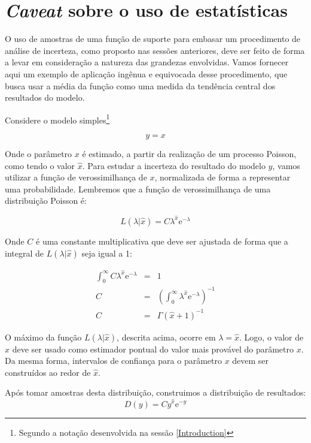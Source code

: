 \section{{\em Caveat} sobre o uso de estatísticas}

O uso de amostras de uma função de suporte para embasar um procedimento de análise de incerteza, como proposto
nas sessões anteriores, deve ser feito de forma a levar em consideração a natureza das grandezas envolvidas.
Vamos fornecer aqui um exemplo de aplicação ingênua e equivocada desse procedimento, que busca usar a média
da função como uma medida da tendência central dos resultados do modelo.

Considere o modelo simples\footnote{Segundo a notação desenvolvida na sessão \ref{Introduction}}

\begin{equation}
	y = x
\end{equation}

Onde o par\^ametro $x$ \'e estimado, a partir da realiza\c c\~ao de um
processo Poisson, como tendo o valor $\hat x$. Para estudar a incerteza
do resultado do modelo $y$, vamos utilizar a fun\c c\~ao de verossimilhan\c ca
de $x$, normalizada de forma a representar uma probabilidade. Lembremos que
a fun\c c\~ao de verossimilhan\c ca de uma distribui\c c\~ao Poisson
\'e:

\begin{equation}
	L \left( \lambda | \hat x \right) = C \lambda^{\hat x} \mathrm{e}^{-\lambda}
\end{equation}

Onde $C$ \'e uma constante multiplicativa que deve ser ajustada de forma
que a integral de $L(\lambda | \hat x)$ seja igual a 1:

\begin {eqnarray*}
\int_0^\infty C \lambda^{\hat x} \mathrm{e}^{-\lambda} & = & 1 \\
C & = & \left( \int_0^\infty  \lambda^{\hat x} \mathrm{e}^{-\lambda} \right)^{-1} \\
C & = & \Gamma(\hat x +1)^{-1}
\end{eqnarray*}

O m\'aximo da fun\c c\~ao $L(\lambda | \hat x)$, descrita acima, ocorre em $\lambda = \hat x$.
Logo, o valor de $\hat x$ deve ser usado como estimador pontual do valor mais prov\'avel
do par\^ametro $x$. Da mesma forma, intervalos de confian\c ca para o par\^ametro $x$ devem
ser constru\'idos ao redor de $\hat x$.

Ap\'os tomar amostras desta distribui\c c\~ao, construimos a distribui\c c\~ao
de resultados:
\begin{equation}
	D(y) = C y^{\hat x} \mathrm{e}^{-y}
\end{equation}

